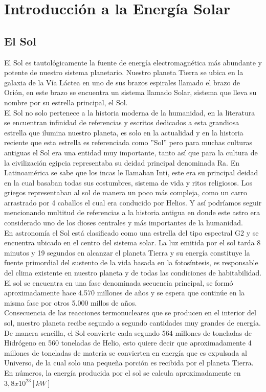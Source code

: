 \chapter{Introducción a la Energía Solar}
\label{solar}

\section{El Sol}
\label{elSol}
El Sol es tautológicamente la fuente de energía electromagnética más abundante y potente de nuestro sistema planetario. Nuestro planeta Tierra se ubica en la galaxia de la Vía Láctea en uno de sus brazos espirales llamado el brazo de Orión, en este brazo se encuentra un sistema llamado Solar\cite{solar:1}, sistema que lleva su nombre por su estrella principal, el Sol.\\

El Sol no solo pertenece a la historia moderna de la humanidad, en la literatura se encuentran infinidad de referencias y escritos dedicados a esta grandiosa estrella que ilumina nuestro planeta, es solo en la actualidad y en la historia reciente que esta estrella es referenciada como ''Sol'' pero para muchas culturas antiguas el Sol era una entidad muy importante, tanto así que para la cultura de la civilización egipcia representaba su deidad principal denominada Ra. En Latinoamérica se sabe que los incas le llamaban Inti, este era su principal deidad en la cual basaban todas sus costumbres, sistema de vida y ritos religiosos. Los griegos representaban al sol de manera un poco más compleja, como un carro arrastrado por 4 caballos el cual era conducido por Helios. Y así podríamos seguir mencionando multitud de referencias a la historia antigua en donde este astro era considerado uno de los dioses centrales y más importantes de la humanidad.\\ 

En astronomía el Sol está clasificado como una estrella del tipo espectral G2 y se encuentra ubicado en el centro del sistema solar. La luz emitida por el sol tarda 8 minutos y 19 segundos\cite{solar:2} en alcanzar el planeta Tierra y su energía constituye la fuente primordial del sustento de la vida basada en la fotosíntesis, es responsable del clima existente en nuestro planeta y de todas las condiciones de habitabilidad.\\

El sol se encuentra en una fase denominada secuencia principal, se formó aproximadamente hace 4.570 millones de años y se espera que continúe en la misma fase por otros 5.000 millos de años\cite{solar:4}.\\
Consecuencia de las reacciones termonucleares que se producen en el interior del sol, nuestro planeta recibe segundo a segundo cantidades muy grandes de energía. De manera sencilla, el Sol convierte cada segundo 564 millones de toneladas de Hidrógeno en 560 toneladas de Helio, esto quiere decir que aproximadamente 4 millones de toneladas de materia se convierten en energía que es expulsada al Universo, de la cual solo una pequeña porción es recibida por el planeta Tierra. En números, la energía producida por el sol se calcula aproximadamente en $3,8 x {10}^{23} [kW]$\cite{solar:3}\\

